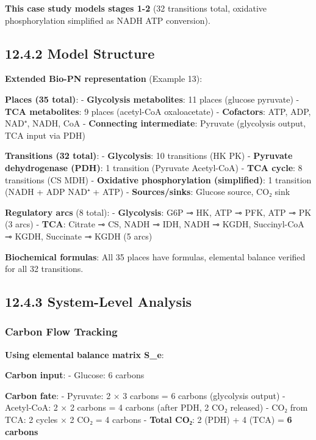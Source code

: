 \textbf{This case study models stages 1-2} (32 transitions total,
oxidative phosphorylation simplified as NADH \textrightarrow ATP conversion).

\hypertarget{model-structure-2}{%
\subsection{12.4.2 Model Structure}\label{model-structure-2}}

\textbf{Extended Bio-PN representation} (Example 13):

\textbf{Places (35 total)}: - \textbf{Glycolysis metabolites}: 11 places
(glucose \textrightarrow pyruvate) - \textbf{TCA metabolites}: 9 places (acetyl-CoA \textrightarrow
oxaloacetate) - \textbf{Cofactors}: ATP, ADP, NAD⁺, NADH, CoA -
\textbf{Connecting intermediate}: Pyruvate (glycolysis output, TCA input
via PDH)

\textbf{Transitions (32 total)}: - \textbf{Glycolysis}: 10 transitions
(HK \textrightarrow PK) - \textbf{Pyruvate dehydrogenase (PDH)}: 1 transition
(Pyruvate \textrightarrow Acetyl-CoA) - \textbf{TCA cycle}: 8 transitions (CS \textrightarrow MDH) -
\textbf{Oxidative phosphorylation (simplified)}: 1 transition (NADH +
ADP \textrightarrow NAD⁺ + ATP) - \textbf{Sources/sinks}: Glucose source, CO₂ sink

\textbf{Regulatory arcs} (8 total): - \textbf{Glycolysis}: G6P ⊸ HK, ATP
⊸ PFK, ATP ⊸ PK (3 arcs) - \textbf{TCA}: Citrate ⊸ CS, NADH ⊸ IDH, NADH
⊸ KGDH, Succinyl-CoA ⊸ KGDH, Succinate ⊸ KGDH (5 arcs)

\textbf{Biochemical formulas}: All 35 places have formulas, elemental
balance verified for all 32 transitions.

\hypertarget{system-level-analysis}{%
\subsection{12.4.3 System-Level Analysis}\label{system-level-analysis}}

\hypertarget{carbon-flow-tracking}{%
\subsubsection{Carbon Flow Tracking}\label{carbon-flow-tracking}}

\textbf{Using elemental balance matrix S\_e}:

\textbf{Carbon input}: - Glucose: 6 carbons

\textbf{Carbon fate}: - Pyruvate: 2 × 3 carbons = 6 carbons (glycolysis
output) - Acetyl-CoA: 2 × 2 carbons = 4 carbons (after PDH, 2 CO₂
released) - CO₂ from TCA: 2 cycles × 2 CO₂ = 4 carbons - \textbf{Total
CO₂}: 2 (PDH) + 4 (TCA) = \textbf{6 carbons} \checkmark

